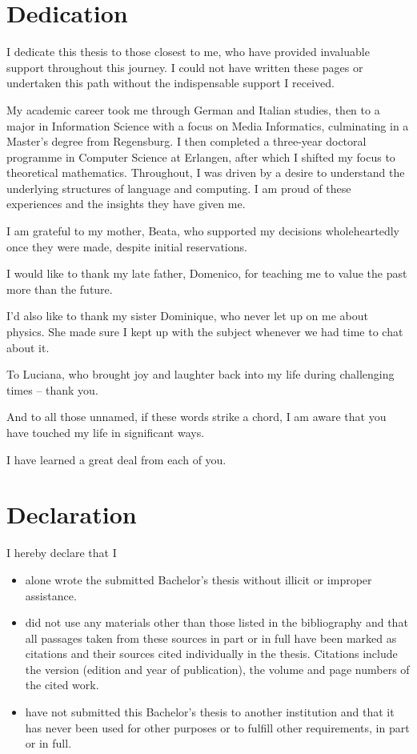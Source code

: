 \documentclass[b5paper, 11pt, twoside]{report}
\begin{document}
\chapter*{Dedication}
I dedicate this thesis to those closest to me, who have provided invaluable support throughout this journey. I could not have written these pages or undertaken this path without the indispensable support I received.

My academic career took me through German and Italian studies, then to a major in Information Science with a focus on Media Informatics, culminating in a Master's degree from Regensburg. I then completed a three-year doctoral programme in Computer Science at Erlangen, after which I shifted my focus to theoretical mathematics. Throughout, I was driven by a desire to understand the underlying structures of language and computing. I am proud of these experiences and the insights they have given me.

I am grateful to my mother, Beata, who supported my decisions wholeheartedly once they were made, despite initial reservations.

I would like to thank my late father, Domenico, for teaching me to value the past more than the future.

I'd also like to thank my sister Dominique, who never let up on me about physics. She made sure I kept up with the subject whenever we had time to chat about it.

To Luciana, who brought joy and laughter back into my life during challenging times – thank you.

And to all those unnamed, if these words strike a chord, I am aware that you have touched my life in significant ways.

I have learned a great deal from each of you.

\chapter*{Declaration}
I hereby declare that I

\begin{itemize}
	\item alone wrote the submitted Bachelor's thesis without illicit or improper
	      assistance.
	      
	\item did not use any materials other than those listed in the bibliography and
	      that all passages taken from these sources in part or in full have been marked
	      as citations and their sources cited individually in the thesis. Citations
	      include the version (edition and year of publication), the volume and page
	      numbers of the cited work.
	      
	\item have not submitted this Bachelor's thesis to another institution and that
	      it has never been used for other purposes or to fulfill other requirements,
	      in part or in full.
\end{itemize}
\end{document}
